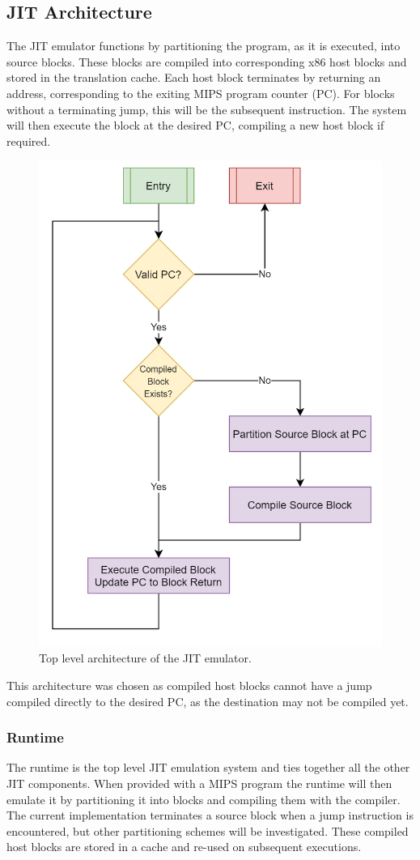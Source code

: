 \subsection{JIT Architecture}
\label{section:jit-arch}

The JIT emulator functions by partitioning the program, as it is executed, into source blocks. These blocks are compiled into corresponding x86 host blocks and stored in the translation cache. Each host block terminates by returning an address, corresponding to the exiting MIPS program counter (PC). For blocks without a terminating jump, this will be the subsequent instruction. The system will then execute the block at the desired PC, compiling a new host block if required.

\begin{figure}[h]
    \centering
    \includegraphics[width=0.5\linewidth]{diagrams/jit.png}
    \caption{Top level architecture of the JIT emulator.}
    \label{figure:jit-arch}
\end{figure}

This architecture was chosen as compiled host blocks cannot have a jump compiled directly to the desired PC, as the destination may not be compiled yet.

\subsubsection{Runtime}

The runtime is the top level JIT emulation system and ties together all the other JIT components. When provided with a MIPS program the runtime will then emulate it by partitioning it into blocks and compiling them with the compiler. The current implementation terminates a source block when a jump instruction is encountered, but other partitioning schemes will be investigated. These compiled host blocks are stored in a cache and re-used on subsequent executions.

